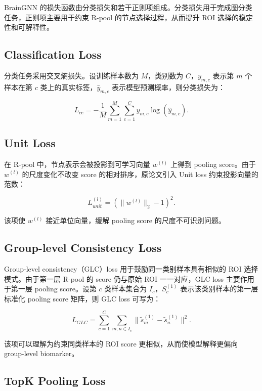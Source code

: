 BrainGNN 的损失函数由分类损失和若干正则项组成。分类损失用于完成图分类任务，正则项主要用于约束 R-pool 的节点选择过程，从而提升 ROI 选择的稳定性和可解释性。

\subsection{Classification Loss}

分类任务采用交叉熵损失。设训练样本数为 $M$，类别数为 $C$，$y_{m,c}$ 表示第 $m$ 个样本在第 $c$ 类上的真实标签，$\hat{y}_{m,c}$ 表示模型预测概率，则分类损失为：

\begin{equation}
  L_{ce}
  =
  -\frac{1}{M}
  \sum_{m=1}^{M}
  \sum_{c=1}^{C}
  y_{m,c}\log(\hat{y}_{m,c}).
\end{equation}

\subsection{Unit Loss}

在 R-pool 中，节点表示会被投影到可学习向量 $w^{(l)}$ 上得到 pooling score。由于 $w^{(l)}$ 的尺度变化不改变 score 的相对排序，原论文引入 Unit loss 约束投影向量的范数：

\begin{equation}
  L_{unit}^{(l)}
  =
  \left(\|w^{(l)}\|_2-1\right)^2.
\end{equation}

该项使 $w^{(l)}$ 接近单位向量，缓解 pooling score 的尺度不可识别问题。

\subsection{Group-level Consistency Loss}

Group-level consistency（GLC）loss 用于鼓励同一类别样本具有相似的 ROI 选择模式。由于第一层 R-pool 的 score 仍与原始 ROI 一一对应，GLC loss 主要作用于第一层 pooling score。设第 $c$ 类样本集合为 $I_c$，$S_c^{(1)}$ 表示该类别样本的第一层标准化 pooling score 矩阵，则 GLC loss 可写为：

\begin{equation}
  L_{GLC}
  =
  \sum_{c=1}^{C}
  \sum_{m,n\in I_c}
  \|\tilde{s}_m^{(1)}-\tilde{s}_n^{(1)}\|^2.
\end{equation}

该项可以理解为约束同类样本的 ROI score 更相似，从而使模型解释更偏向 group-level biomarker。

\subsection{TopK Pooling Loss}

